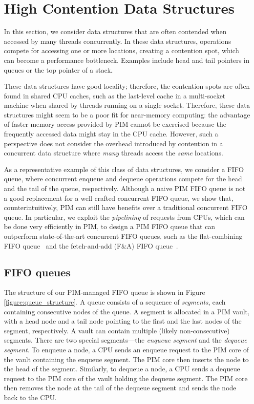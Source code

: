 
\section{High Contention Data Structures}
\label{section:contended}
In this section, we consider data structures that are often contended when accessed 
by many threads concurrently. In these data structures, operations compete for accessing one or more 
locations, creating a contention spot, which can become a performance bottleneck.
Examples include head and tail pointers in queues or the top pointer of a stack.

These data structures have good locality; therefore, the contention spots are often found 
in shared CPU caches, such as the last-level cache in a multi-socket machine 
when shared by threads running on a single socket. Therefore, these data structures might 
seem to be a poor fit for near-memory computing: the advantage of faster memory access provided by PIM 
cannot be exercised because the frequently accessed data might stay in the CPU cache. 
However, such a perspective does not consider the overhead introduced by contention 
in a concurrent data structure where \emph{many} threads access the \emph{same} locations. 

As a representative example of this class of data structures, we consider a FIFO queue, 
where concurrent enqueue
and dequeue operations compete for the head and the tail of the queue, respectively. 
Although a naive PIM FIFO queue is not a good replacement for a well crafted concurrent FIFO queue, 
we show that, counterintuitively, PIM can still have benefits over a traditional concurrent FIFO 
queue. In particular, we exploit the \emph{pipelining} of requests from CPUs, 
which can be done very efficiently in PIM, to design a PIM FIFO queue that can outperform 
state-of-the-art concurrent FIFO queues, such as the flat-combining FIFO queue~\cite{Hendler10} 
and the fetch-and-add (F\&A) FIFO queue~\cite{Morrison13}.

\subsection{FIFO queues}
The structure of our PIM-managed FIFO queue is shown in Figure \ref{figure:queue_structure}.
A queue consists of a sequence of \emph{segments}, each containing consecutive nodes of the queue.
A segment is allocated in a PIM vault, with a head node and a tail node pointing to the first 
and the last nodes of the segment, respectively.
A vault can contain multiple (likely non-consecutive) segments. 
There are two special segments---the \textit{enqueue segment} and the \textit{dequeue segment}.
To enqueue a node, a CPU sends an enqueue request to the PIM core of the vault 
containing the enqueue segment.
The PIM core then inserts the node to the head of the segment.
Similarly, to dequeue a node, a CPU sends a dequeue request to the PIM core of the vault
holding the dequeue segment. 
The PIM core then removes the node at the tail of the dequeue segment and 
sends the node back to the CPU.

